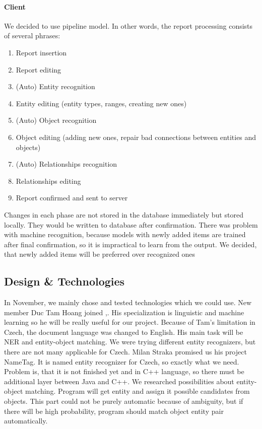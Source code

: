 \paragraph{Client}
We decided to use pipeline model. %
In other words, the report processing consists of several phrases:

\begin{enumerate}
\item Report insertion
\item Report editing
\item (Auto) Entity recognition
\item Entity editing (entity types, ranges, creating new ones)
\item (Auto) Object recognition
\item Object editing (adding new ones, repair bad connections between entities and objects)
\item (Auto) Relationships recognition
\item Relationships editing
\item Report confirmed and sent to server
\end{enumerate}

Changes in each phase are not stored in the database immediately but
stored locally. They would be written to database after confirmation. There was problem with
machine recognition, because models with newly added items are trained after final 
confirmation, so it is impractical to learn from the output. 
We decided, that newly added items will be preferred over recognized ones
 
\subsection{Design \& Technologies}
In November, we mainly chose and tested technologies which we could use. New member
Duc Tam Hoang joined \textan{},. His specialization is
linguistic and machine learning so he will be really useful for our project.
Because of Tam's limitation in Czech, the document language was changed to English.
His main task will be NER and entity-object matching. We were trying different
entity recognizers, but there are not many applicable for Czech. Milan Straka
promised us his project NameTag. It is named entity recognizer for Czech, so
exactly what we need. Problem is, that it is not finished yet and in C++
language, so there must be additional layer between Java and C++.
We researched possibilities about entity-object matching. Program will get
entity and assign it possible candidates from objects. This part could not be
purely automatic because of ambiguity, but if there will be high probability,
program should match object entity pair automatically.

